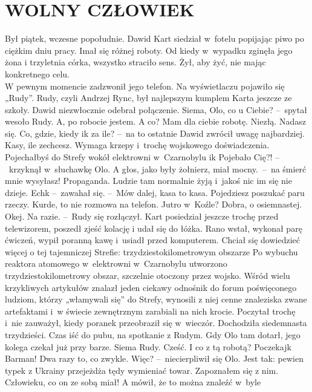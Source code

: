 \documentclass[../MAIN.tex]{subfiles}
\begin{document}
\section*{WOLNY CZŁOWIEK}
\mm Był piątek, wczesne popołudnie. Dawid Kart siedział w~fotelu popijając piwo po
ciężkim dniu pracy. Imał się różnej roboty. Od kiedy w~wypadku zginęła jego żona
i trzyletnia córka, wszystko straciło sens. Żył, aby żyć, nie mając konkretnego
celu.\\
W pewnym momencie zadzwonił jego telefon. Na wyświetlaczu pojawiło się „Rudy”.
Rudy, czyli Andrzej Rync, był najlepszym kumplem Karta jeszcze ze szkoły. Dawid
niezwłocznie odebrał połączenie.
\dd
\sd
\xx Siema, Olo, co u Ciebie? --~spytał wesoło Rudy.
\xx A, po robocie jestem. A co?
\xx Mam dla ciebie robotę. Niezłą. Nadasz się.
\xx Co, gdzie, kiedy i\3k za ile? --~na to ostatnie Dawid zwrócił uwagę
najbardziej.
\xx Kasy, ile zechcesz. Wymaga krzepy i~trochę wojskowego doświadczenia.
Pojechałbyś do Strefy wokół elektrowni w~Czarnobylu i\3k
\xx Pojebało Cię?! --~krzyknął w~słuchawkę Olo. A głos, jako były żołnierz,
miał mocny.~--~na śmierć mnie wysyłasz!
\xx Propaganda. Ludzie tam normalnie żyją i~jakoś nic im się nie dzieje.
\xx Ech\3k --~zawahał się. --~Mów dalej, kasa to kasa.
\xx Pojedziesz poszukać paru rzeczy. Kurde, to nie rozmowa na telefon. Jutro w~Koźle?
\xx Dobra, o osiemnastej.
\xx Okej. Na razie. --~Rudy się rozłączył.
\qd
\hspace{17.5em} Kart posiedział jeszcze trochę przed telewizorem, poszedł zjeść kolację i
udał się do łóżka. Rano wstał, wykonał parę ćwiczeń, wypił poranną kawę i~usiadł
przed komputerem. Chciał się dowiedzieć więcej o tej tajemniczej Strefie:
trzydziestokilometrowym obszarze  Po
wybuchu reaktora atomowego w~elektrowni   w~Czarnobylu utworzono
trzydziestokilometrowy obszar, szczelnie otoczony przez wojsko.
Wśród wielu
krzykliwych artykułów znalazł jeden ciekawy odnośnik do forum poświęconego
ludziom, którzy „włamywali się” do Strefy, wynosili z niej cenne znaleziska
zwane artefaktami i~w świecie zewnętrznym zarabiali na nich krocie. Poczytał
trochę i~nie zauważył, kiedy poranek przeobraził się w~wieczór. Dochodziła
siedemnasta trzydzieści. Czas iść do pubu, na spotkanie z Rudym. Gdy Olo tam
dotarł, jego kolega czekał już przy barze.
\dd
\sd
\xx Siema Rudy.
\xx Cześć.
\xx I co z tą robotą?
\xx Poczekaj\3k Barman! Dwa razy to, co zwykle.
\xx Więc? --~niecierpliwił się Olo.
\xx Jest tak: pewien typek z Ukrainy przejeżdża tędy wymieniać towar. Zapoznałem
się z nim. Człowieku, co on ze sobą miał! A mówił, że to można znaleźć w~byle
\end{document}
